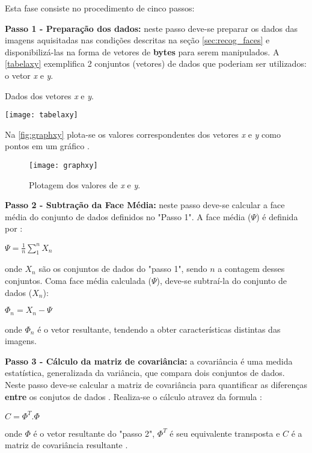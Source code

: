 Esta fase consiste no procedimento de cinco passos:

\textbf{Passo 1 - Preparação dos dados:}  neste passo deve-se preparar os dados das imagens aquisitadas nas condições descritas na seção \autoref{sec:recog_faces} e disponibilizá-las na forma de vetores de \textbf{bytes} para serem manipulados. A \autoref{tabelaxy} exemplifica 2 conjuntos (vetores) de dados que poderiam ser utilizados: o vetor \textit{x} e \textit{y}.

\begin{table}[h]
	\centering
	\caption{Dados dos vetores \textit{x} e \textit{y}.}
	\texttt{[image: tabelaxy]}
	\label{tabelaxy}
\end{table}

Na \autoref{fig:graphxy} plota-se os valores correspondentes dos vetores \textit{x} e \textit{y} como pontos em um gráfico \cite{drmathew_java_programming}.


\begin{figure}[h]
	\centering
	\texttt{[image: graphxy]}
	\caption{Plotagem dos valores de \textit{x} e \textit{y}.}
	\label{fig:graphxy}
\end{figure}

\textbf{Passo 2 - Subtração da Face Média:} neste passo deve-se calcular a face média do conjunto de dados definidos no "Passo 1". A face média ($\Psi$) é definida por \cite{geysilva}:
\begin{center}
	$\Psi = \frac{1}{n} \sum_{1}^{n} X_n$
\end{center}
onde $X_n$ são os conjuntos de dados do "passo 1", sendo $n$ a contagem desses conjuntos. Coma face média calculada  ($\Psi$), deve-se subtraí-la do conjunto de dados ($X_n$):
\begin{center}
	$\Phi_n = X_n - \Psi$
\end{center}
onde $\Phi_n$ é o vetor resultante, tendendo a obter características distintas das imagens. 

\textbf{Passo 3 - Cálculo da matriz de covariância:} a covariância é uma medida estatística, generalizada da variância, que compara dois conjuntos de dados. Neste passo deve-se calcular a matriz de covariância para quantificar as diferenças \textbf{entre} os conjutos de dados \cite{drmathew_java_programming}.  Realiza-se o cálculo atravez da formula \cite{geysilva}: 
\begin{center}
	$C = \Phi^T . \Phi$	
\end{center}
onde $\Phi$ é o vetor resultante do "passo 2", $\Phi^T$ é seu equivalente transposta e $C$ é a matriz de covariância resultante \cite{geysilva}.

